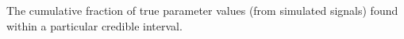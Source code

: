 \label{fig:pp_standard}
The cumulative fraction of true parameter values (from simulated signals) found within
a particular credible interval.
